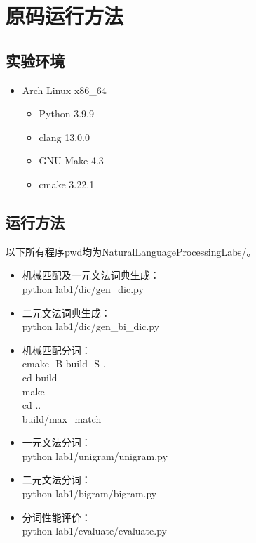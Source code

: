 \appendix

\section{原码运行方法}

\subsection{实验环境}

\begin{itemize}
  \item Arch Linux x86\_64
        \begin{itemize}
          \item Python 3.9.9
          \item clang 13.0.0
          \item GNU Make 4.3
          \item cmake 3.22.1
        \end{itemize}
\end{itemize}

\subsection{运行方法}

以下所有程序pwd均为NaturalLanguageProcessingLabs/。

\begin{itemize}
  \item 机械匹配及一元文法词典生成：\\ python lab1/dic/gen\_dic.py
  \item 二元文法词典生成：\\ python lab1/dic/gen\_bi\_dic.py
  \item 机械匹配分词：\\ cmake -B build -S .\\ cd build\\ make\\ cd ..\\ build/max\_match
  \item 一元文法分词：\\ python lab1/unigram/unigram.py
  \item 二元文法分词：\\ python lab1/bigram/bigram.py
  \item 分词性能评价：\\ python lab1/evaluate/evaluate.py
\end{itemize}
